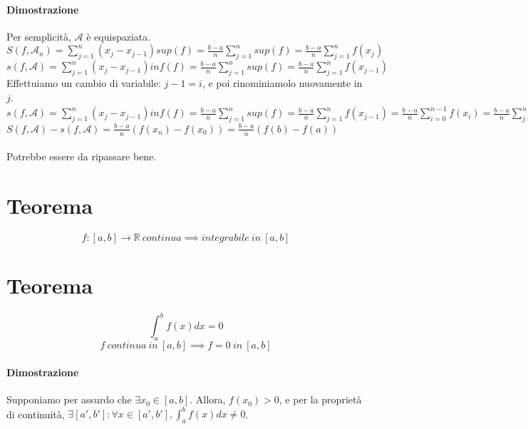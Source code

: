 \documentclass{article}
\begin{document}
\paragraph{Dimostrazione}
Per semplicità, \(\mathcal{A}\) è equispaziata.\\
\(S(f, \mathcal{A}_n) = \sum_{j=1}^n (x_j - x_{j-1}) sup(f) = \frac{b - a}{n} \sum_{j=1}^n sup(f) = \frac{b - a}{n} \sum_{j=1}^n f(x_j)\)\\
\(s(f, \mathcal{A}) = \sum_{j=1}^n (x_j - x_{j-1}) inf(f) = \frac{b - a}{n} \sum_{j=1}^n sup(f) = \frac{b - a}{n} \sum_{j=1}^n f(x_{j-1})\)\\
Effettuiamo un cambio di variabile: \(j-1 = i\), e poi rinominiamolo nuovamente in \(j\).\\
\(s(f, \mathcal{A}) = \sum_{j=1}^n (x_j - x_{j-1}) inf(f) = \frac{b - a}{n} \sum_{j=1}^n sup(f) = \frac{b - a}{n} \sum_{j=1}^n f(x_{j-1}) = \frac{b - a}{n} \sum^{n-1}_{i=0} f(x_i) = \frac{b - a}{n} \sum_{j = 0}^{n - 1} f(x_m) = \frac{b - a}{n} \sum_{j = 0}^{n - 1} = \frac{b - a}{n} ( \sum_{j = 0}^{n - 1} f(x_m) + f(x_0) )\)\\
\(S(f, \mathcal{A}) - s(f, \mathcal{A}) = \frac{b - a}{n} (f(x_n) - f(x_0)) = \frac{b - a}{n} (f(b) - f(a))\)\\
\\
Potrebbe essere da ripassare bene.

\section{Teorema}
\[f : [a, b] \to \mathbb{R}\ continua \implies integrabile\ in\ [a, b]\]

\section{Teorema}
\[\int_a^b f(x) dx = 0\]
\[f\ continua\ in\ [a, b] \implies f = 0\ in\ [a, b]\]

\paragraph{Dimostrazione}
Supponiamo per assurdo che \(\exists x_0 \in [a, b]\).
Allora, \(f(x_0) > 0\), e per la proprietà di continuità, \(\exists [a', b'] : \forall x \in [a', b'], \int_a^b f(x) dx \neq 0\).
\end{document}
